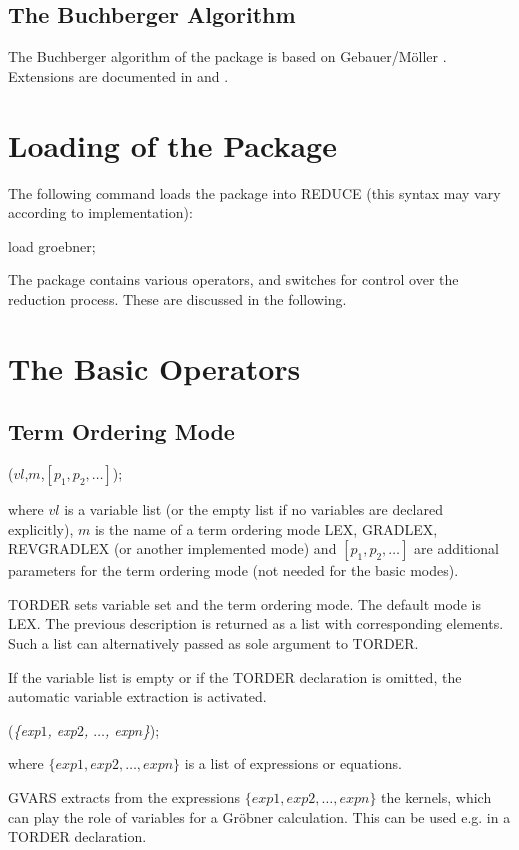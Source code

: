 \subsection{The Buchberger Algorithm}
The Buchberger algorithm of the package is based on {\sc
Gebauer/M\"oller} \cite{Gebauer:88}.
Extensions are documented in \cite{Melenk:88} and \cite{Giovini:91}.

\section{Loading of the Package}
The following command loads the package into
REDUCE (this syntax may vary according to implementation):
\begin{center}
load groebner;
\end{center}

The package contains various operators, and switches for control
over the reduction process. These are discussed in the following.

\section{The Basic Operators}

\subsection{Term Ordering Mode}

\begin{description}
\item [{\it TORDER}]($vl$,$m$,$[p_1,p_2,\ldots]$);

where $vl$ is a variable list (or the empty list if
no variables are declared explicitly),
$m$ is the name of a term ordering mode LEX, GRADLEX,
REV\-GRAD\-LEX (or another implemented mode) and
$[p_1,p_2,\ldots]$ are additional parameters for the
term ordering mode (not needed for the basic modes).

TORDER sets variable set and the term ordering mode.
The default mode is LEX. The previous description is returned
as a list with corresponding elements. Such a list can
alternatively passed as sole argument to TORDER.

If the variable list is empty or if the TORDER declaration
is omitted, the automatic variable extraction is activated.

\item[{\it GVARS}] ({\it\{exp$1$, exp$2$, $ \ldots$, exp$n$\}});

 where $\{exp1, exp2, \ldots , expn\}$ is a list of expressions or
equations.

GVARS extracts from the expressions $\{exp1, exp2, \ldots , expn\}$
the kernels, which can play the role of variables for a Gr\"obner
calculation. This can be used e.g. in a TORDER declaration.
\end{description}

